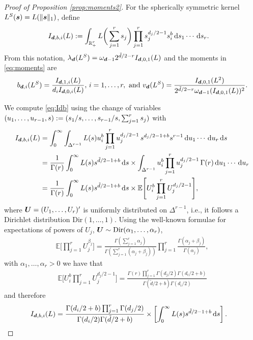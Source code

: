 \documentclass[oneside,11pt]{article}
\begin{document}
\begin{proof}[Proof of Proposition \ref{prop:moments2}]
For the spherically symmetric kernel $L^S(\boldsymbol{s})=L(\|\boldsymbol{s}\|_1)$, define
\begin{align}
    I_{\boldsymbol{d}, b,i}(L)&:=\int_{\mathbb{R}_+^r} L\bigg(\sum_{j=1}^{r} s_j\bigg) \prod_{j=1}^{r} s_j^{d_j / 2-1} s_i^{b}\,\mathrm{d} s_1 \cdots \,\mathrm{d} s_r.\label{eq:Idb}
\end{align}
From this notation, $\lambda_{\boldsymbol{d}}(L^S)=\omega_{\boldsymbol{d}-1}2^{\tilde{d}/2-r}I_{\boldsymbol{d},0,1}(L)$ and the moments in \eqref{eq:moments} are
\begin{align}
    b_{\boldsymbol{d},i}(L^S)=\frac{I_{\boldsymbol{d},1,i}(L)}{d_iI_{\boldsymbol{d}, 0,i}(L)},\, i=1,\ldots,r, \text{ and } v_{\boldsymbol{d}}(L^S)=\frac{I_{\boldsymbol{d},0,1}(L^2)}{2^{\tilde{d}/2-r}\omega_{\boldsymbol{d}-1}(I_{\boldsymbol{d},0,1}(L))^2}. \label{eq:momentsI}
\end{align}

We compute \eqref{eq:Idb} using the change of variables $(u_1,\ldots,u_{r-1},s):=(s_1/s,\ldots,s_{r-1}/s,\sum_{j=1}^rs_j)$ with %
\begin{align*}
    I_{\boldsymbol{d}, b,i}(L)&=\int_{0}^{\infty} \int_{\Delta^{r-1}} L(s) u_i^{b}\prod_{j=1}^{r} u_{j}^{d_j / 2-1} \, s^{d_j / 2-1+b}s^{r-1} \,\mathrm{d} u_{1} \cdots \,\mathrm{d} u_{r}\,\mathrm{d} s\\
    &=\frac{1}{\Gamma(r)} \int_{0}^{\infty} L(s) s^{\tilde{d} / 2-1+b}\,\mathrm{d} s \times \int_{\Delta^{r-1}} u_{i}^b\prod_{j=1}^{r} u_{j}^{d_j / 2-1}  \,\Gamma(r) \,\mathrm{d} u_{1} \cdots \,\mathrm{d} u_{r} \\
    &=\frac{1}{\Gamma(r)} \int_{0}^{\infty} L(s) s^{\tilde{d} / 2-1+b}\,\mathrm{d} s \times \mathbb{E}\Bigg[U_{i}^{b}\prod_{j=1}^{r} U_{j}^{d_j / 2-1} \Bigg],
\end{align*}
where $\boldsymbol{U}=(U_1,\ldots,U_r)'$ is uniformly distributed on $\Delta^{r-1}$, i.e., it follows a Dirichlet distribution $\mathrm{Dir}(1,\ldots,1)$. Using the well-known formulae for expectations of powers of $U_j$, $\boldsymbol{U}\sim\mathrm{Dir}(\alpha_1,\ldots,\alpha_r)$,
\begin{align*}
    \mathbb{E}\Bigg[\prod_{j=1}^{r} U_j^{\beta_j}\Bigg]=\frac{\Gamma(\sum_{j=1}^r \alpha_j)}{\Gamma(\sum_{j=1}^r(\alpha_j+\beta_j))} \prod_{j=1}^r \frac{\Gamma(\alpha_j+\beta_j)}{\Gamma(\alpha_j)},
\end{align*}
with $\alpha_1,\ldots,\alpha_r>0$ we have that
\begin{align*}
    \mathbb{E}\Bigg[U_{i}^{b}\prod_{j=1}^{r} U_{j}^{d_j / 2-1} \Bigg]=\frac{\Gamma(r)\prod_{j=1}^r \Gamma(d_j/2)\Gamma(d_i/2+b)}{\Gamma(\tilde{d}/2+b)\Gamma(d_i/2)}
\end{align*}
and therefore
\begin{align}
    I_{\bd, b,i}(L)%
    &=\frac{\Gamma(d_i/2+b)\prod_{j=1}^r \Gamma(d_j/2)}{\Gamma(d_i/2)\Gamma(\tilde{d}/2+b)}\times \left[\int_{0}^{\infty} L(s) s^{\tilde{d} / 2-1+b} \,\rd s\right]. \label{eq:momentsI2}
\end{align}


\end{proof}
\end{document}
